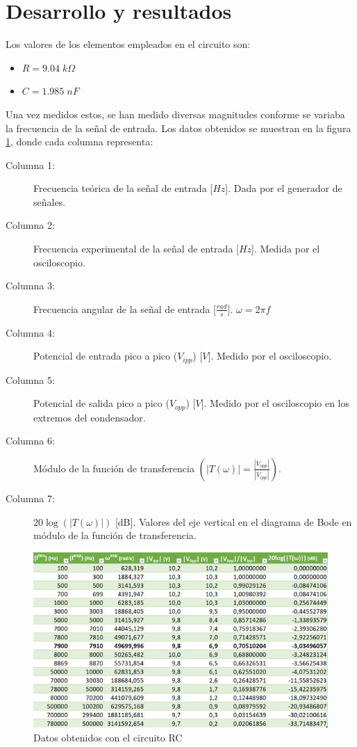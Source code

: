 \section{Desarrollo y resultados}
Los valores de los elementos empleados en el circuito son:
\begin{itemize}
    \item $R = 9.04\;k\Omega$
    \item $C = 1.985\;nF$
\end{itemize}
Una vez medidos estos, se han medido diversas magnitudes conforme se variaba la frecuencia de la señal de entrada. Los datos obtenidos se muestran en la figura \ref{fig:03.Datos}, donde cada columna representa:
\begin{description}
    \item [Columna 1:] Frecuencia teórica de la señal de entrada [$Hz$]. Dada por el generador de señales.
    \item [Columna 2:] Frecuencia experimental de la señal de entrada [$Hz$]. Medida por el osciloscopio.
    \item [Columna 3:] Frecuencia angular de la señal de entrada [$\frac{rad}{s}$]. $\omega = 2\pi f$
    \item [Columna 4:] Potencial de entrada pico a pico ($V_{ipp}$) [$V$]. Medido por el osciloscopio.
    \item [Columna 5:] Potencial de salida pico a pico ($V_{opp}$) [$V$]. Medido por el osciloscopio en los extremos del condensador.
    \item [Columna 6:] Módulo de la función de transferencia $\left(|T(\omega)| = \frac{|V_{opp}|}{|V_{ipp}|}\right)$.
    \item [Columna 7:] $20\log(|T(\omega)|)$ [dB]. Valores del eje vertical en el diagrama de Bode en módulo de la función de transferencia.
\end{description}

\begin{figure}
    \centering
    \includegraphics[width=13.5cm]{Imágenes 03/Tabla_Datos_Exp.png}
    \caption{Datos obtenidos con el circuito RC}
    \label{fig:03.Datos}
\end{figure}


